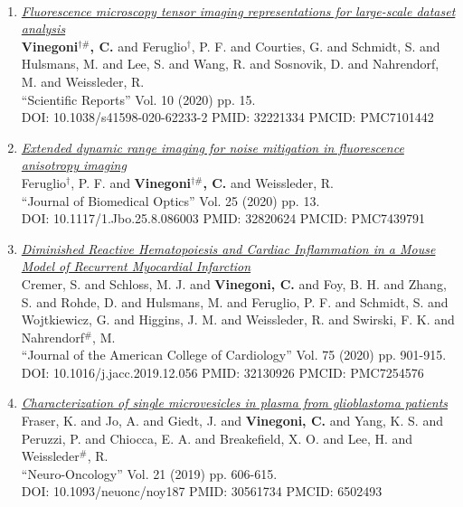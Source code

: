 \documentclass{resume}
\begin{document}
\begin{category}{~~}
\begin{enumerate}
\item \href{https://cvinegoni.github.io/assets/pdf/papers/2020-SCIREP.pdf}{\it  Fluorescence microscopy tensor imaging representations for large-scale dataset analysis} \\ {\bf Vinegoni$^{\dag \#}$, C.} and Feruglio$^\dag$, P. F. and Courties, G. and Schmidt, S. and Hulsmans, M. and Lee, S. and Wang, R. and Sosnovik, D. and Nahrendorf, M. and Weissleder, R. \\ ``Scientific Reports'' Vol. 10 (2020) pp. 15. \\ DOI: 10.1038/s41598-020-62233-2 PMID: 32221334 PMCID: PMC7101442

\item \href{https://cvinegoni.github.io/assets/pdf/papers/2020-JBO.pdf}{\it  Extended dynamic range imaging for noise mitigation in fluorescence anisotropy imaging} \\ Feruglio$^\dag$, P. F. and {\bf Vinegoni$^{\dag \#}$, C.} and Weissleder, R. \\ ``Journal of Biomedical Optics'' Vol. 25 (2020) pp. 13. \\ DOI: 10.1117/1.Jbo.25.8.086003 PMID: 32820624 PMCID: PMC7439791

\item \href{https://cvinegoni.github.io/assets/pdf/papers/2020-JAMCC.pdf}{\it  Diminished Reactive Hematopoiesis and Cardiac Inflammation in a Mouse Model of Recurrent Myocardial Infarction} \\ Cremer, S. and Schloss, M. J. and {\bf Vinegoni, C.} and Foy, B. H. and Zhang, S. and Rohde, D. and Hulsmans, M. and Feruglio, P. F. and Schmidt, S. and Wojtkiewicz, G. and Higgins, J. M. and Weissleder, R. and Swirski, F. K. and Nahrendorf$^\#$, M. \\ ``Journal of the American College of Cardiology'' Vol. 75 (2020) pp. 901-915. \\ DOI: 10.1016/j.jacc.2019.12.056 PMID: 32130926 PMCID: PMC7254576

\item \href{https://cvinegoni.github.io/assets/pdf/papers/2019-NO.pdf}{\it  Characterization of single microvesicles in plasma from glioblastoma patients} \\ Fraser, K. and Jo, A. and Giedt, J. and {\bf Vinegoni, C.} and Yang, K. S. and Peruzzi, P. and Chiocca, E. A. and Breakefield, X. O. and Lee, H. and Weissleder$^\#$, R. \\ ``Neuro-Oncology'' Vol. 21 (2019) pp. 606-615. \\ DOI: 10.1093/neuonc/noy187 PMID: 30561734 PMCID: 6502493


\end{enumerate}
\end{category}
\end{document}
